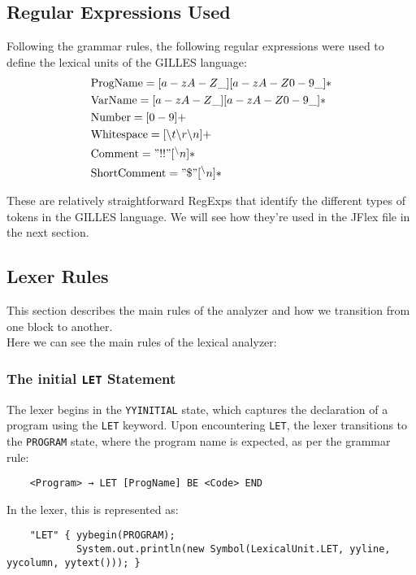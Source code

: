 \documentclass{article}
\begin{document}
	\subsection{Regular Expressions Used}
	Following the grammar rules, the following regular expressions were used to define the lexical units of the GILLES language:
	\begin{align*}
		&\text{ProgName}     = [a-zA-Z\_][a-zA-Z0-9\_]* \\
		&\text{VarName}      = [a-zA-Z\_][a-zA-Z0-9\_]* \\
		&\text{Number}       = [0-9]+ \\
		&\text{Whitespace}   = [ \text{\textbackslash} t\text{\textbackslash} r\text{\textbackslash} n]+ \\
		&\text{Comment}      = "!!"[^\text{\textbackslash} n]* \\
		&\text{ShortComment} = "\$"[^\text{\textbackslash} n]*
	\end{align*}

	These are relatively straightforward RegExps that identify the different types of tokens in the GILLES language. We will see how they're used in the JFlex file in the next section.\\

	\subsection{Lexer Rules}
	This section describes the main rules of the analyzer and how we transition from one block to another.\\

	Here we can see the main rules of the lexical analyzer:

	\subsubsection{The initial \texttt{LET} Statement}
	The lexer begins in the \texttt{YYINITIAL} state, which captures the declaration of a program using the \texttt{LET} keyword. Upon encountering \texttt{LET}, the lexer transitions to the \texttt{PROGRAM} state, where the program name is expected, as per the grammar rule:

	\begin{verbatim}
	<Program> → LET [ProgName] BE <Code> END
	\end{verbatim}

	In the lexer, this is represented as:

	\begin{verbatim}
	"LET" { yybegin(PROGRAM);
			System.out.println(new Symbol(LexicalUnit.LET, yyline, yycolumn, yytext())); }
	\end{verbatim}
\end{document}
